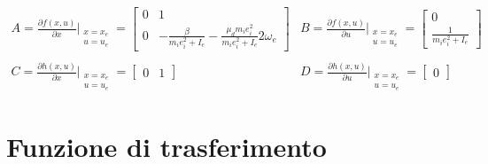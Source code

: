 \documentclass[a4paper,12pt,italian]{article}
\begin{document}
\begin{equation*}
    \begin{array}{ll}
    A = \frac{\partial f(x,u)}{\partial x} \bigg|_{\substack{x=x_e\\u=u_e}} =
    \begin{bmatrix} 
        0 & 1 \\ 
        0 & - \frac{\beta}{m_ie_i^2 + I_e} - \frac{\mu_dm_ie_i^2}{m_ie_i^2 + I_e} 2\omega_e 
    \end{bmatrix}
    &B = \frac{\partial f(x,u)}{\partial u} \bigg|_{\substack{x=x_e\\u=u_e}} = 
    \begin{bmatrix} 
        0 \\ 
        \frac{1}{m_ie_i^2 + I_e}
    \end{bmatrix}\\ \\
    C = \frac{\partial h(x,u)}{\partial x} \bigg|_{\substack{x=x_e\\u=u_e}} =
    \begin{bmatrix} 
        0 & 1
    \end{bmatrix}
    &D = \frac{\partial h(x,u)}{\partial u} \bigg|_{\substack{x=x_e\\u=u_e}} =
    \begin{bmatrix} 
        0
    \end{bmatrix}
    \end{array}
\end{equation*}


\section{Funzione di trasferimento}
\end{document}
